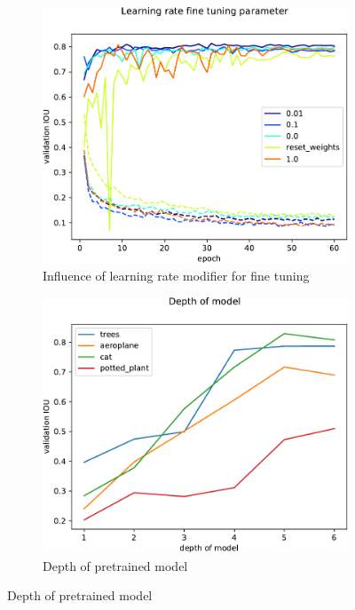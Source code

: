 \documentclass{article}
\begin{document}
\begin{figure}[t]
\centering
\begin{subfigure}{.5\textwidth}
  \centering
  \includegraphics[width=0.9\linewidth]{images/fine_tuning.pdf}
  \caption{Influence of learning rate modifier for fine tuning}  
  \label{fig:fine}
\end{subfigure}%
\begin{subfigure}{.5\textwidth}
  \centering
  \includegraphics[width=0.9\linewidth]{images/depth.pdf}
  \caption{Depth of pretrained model}  
  \label{fig:depth}
\end{subfigure}

\label{fig:training}
\end{figure}
\end{document}
